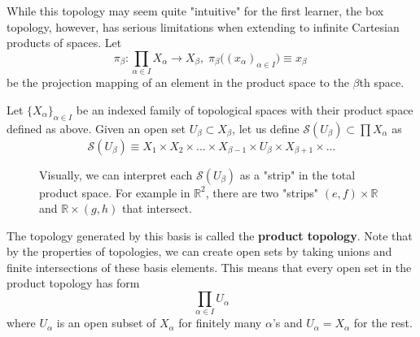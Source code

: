     While this topology may seem quite "intuitive" for the first learner, the box topology, however, has serious limitations when extending to infinite Cartesian products of spaces. Let 
    \begin{equation}
      \pi_\beta: \prod_{\alpha \in I} X_\alpha \rightarrow X_\beta, \; \pi_\beta \big( (x_\alpha)_{\alpha \in I}\big) \equiv x_\beta\
    \end{equation}
    be the projection mapping of an element in the product space to the $\beta$th space. 

    \begin{theorem}
      Let $\{X_\alpha\}_{\alpha \in I}$ be an indexed family of topological spaces with their product space defined as above. Given an open set $U_\beta \subset X_\beta$, let us define $\mathscr{S} (U_\beta) \subset \prod X_\alpha$ as 
      \begin{equation}
        \mathscr{S}(U_\beta) \equiv X_1 \times X_2 \times ... \times X_{\beta -1} \times U_\beta \times X_{\beta+1} \times ... 
      \end{equation}
      \begin{figure}[H]
        \centering 
        \caption{Visually, we can interpret each $\mathscr{S} (U_\beta)$ as a "strip" in the total product space. For example in $\mathbb{R}^2$, there are two "strips" $(e, f) \times \mathbb{R}$ and $\mathbb{R} \times (g, h)$ that intersect. }
        \label{fig:product_topology}
      \end{figure}
      The topology generated by this basis is called the \textbf{product topology}. Note that by the properties of topologies, we can create open sets by taking unions and finite intersections of these basis elements. This means that every open set in the product topology has form
      \begin{equation}
        \prod_{\alpha \in I} U_\alpha
      \end{equation}
      where $U_\alpha$ is an open subset of $X_\alpha$ for finitely many $\alpha$'s and $U_\alpha = X_\alpha$ for the rest. 
    \end{theorem}

